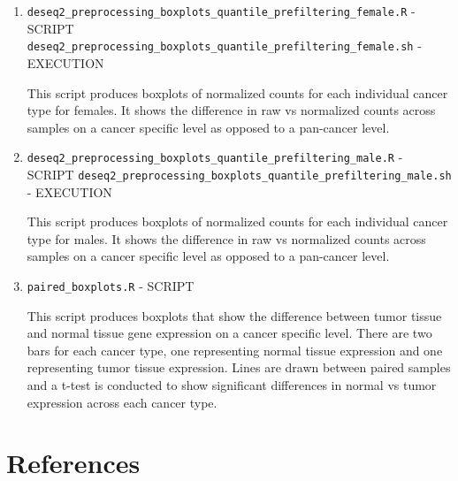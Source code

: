 \documentclass[10pt]{article}
\begin{document}
\begin{enumerate}
	\item \texttt{deseq2\_preprocessing\_boxplots\_quantile\_prefiltering\_female.R} - SCRIPT \newline
	\texttt{deseq2\_preprocessing\_boxplots\_quantile\_prefiltering\_female.sh} - EXECUTION 
	
	This script produces boxplots of normalized counts for each individual cancer type for females. It shows the difference in raw vs normalized counts across samples on a cancer specific level as opposed to a pan-cancer level.
	
	\item \texttt{deseq2\_preprocessing\_boxplots\_quantile\_prefiltering\_male.R} - SCRIPT \newline
	\texttt{deseq2\_preprocessing\_boxplots\_quantile\_prefiltering\_male.sh} - EXECUTION 
	
	This script produces boxplots of normalized counts for each individual cancer type for males. It shows the difference in raw vs normalized counts across samples on a cancer specific level as opposed to a pan-cancer level.
	
	\item \texttt{paired\_boxplots.R} - SCRIPT
	
	This script produces boxplots that show the difference between tumor tissue and normal tissue gene expression on a cancer specific level. There are two bars for each cancer type, one representing normal tissue expression and one representing tumor tissue expression. Lines are drawn between paired samples and a t-test is conducted to show significant differences in normal vs tumor expression across each cancer type.
	
\end{enumerate}

\clearpage\newpage
\section{References}


\nocite{*}
\printbibliography[heading=none, sorting=nyt]
\newpage

%
\end{document}
